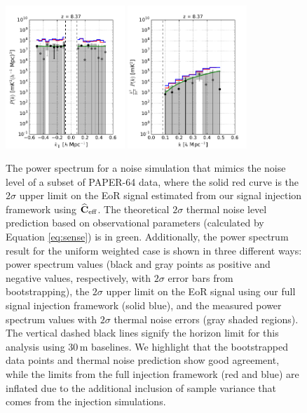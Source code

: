 \documentclass[preprint2,numberedappendix,tighten]{aastex6}  %
\begin{document}
\begin{figure}
	\centering
	\includegraphics[width=0.4\textwidth]{plots/ps1_noise_add.pdf}
	\includegraphics[width=0.4\textwidth]{plots/ps2_noise_add.pdf}
	\caption{The power spectrum for a noise simulation that mimics the noise level of a subset of PAPER-64 data, where the solid red curve is the $2\sigma$ upper limit on the EoR signal estimated from our signal injection framework using $\widehat{\textbf{C}}_{\rm eff}$. The theoretical $2\sigma$ thermal noise level prediction based on observational parameters (calculated by Equation \eqref{eq:sense}) is in green. Additionally, the power spectrum result for the uniform weighted case is shown in three different ways: power spectrum values (black and gray points as positive and negative values, respectively, with $2\sigma$ error bars from bootstrapping), the $2\sigma$ upper limit on the EoR signal using our full signal injection framework (solid blue), and the measured power spectrum values with $2\sigma$ thermal noise errors (gray shaded regions). The vertical dashed black lines signify the horizon limit for this analysis using $30$\,m baselines. We highlight that the bootstrapped data points and thermal noise prediction show good agreement, while the limits from the full injection framework (red and blue) are inflated due to the additional inclusion of sample variance that comes from the injection simulations.}
	\label{fig:ps_noise}
\end{figure}
\end{document}
